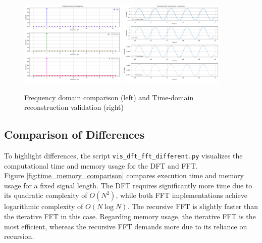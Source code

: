 \documentclass[12pt, a4paper]{report}
\begin{document}
\begin{figure}[h!]
	\centering
	\includegraphics[width=0.45\textwidth]{2023_11_29_Bilder_Dokumentation/Frequency_Domain_Comparison.png}
	\includegraphics[width=0.45\textwidth]{2023_11_29_Bilder_Dokumentation/Time_Domain_Comparison.png}
	\caption{Frequency domain comparison (left) and Time-domain reconstruction validation (right)}
	\label{fig:frequency_domain_comparison}
\end{figure}

\subsection{Comparison of Differences}
To highlight differences, the script \texttt{vis\_dft\_fft\_different.py} visualizes the computational time and memory usage for the \ac{DFT} and \ac{FFT}.\\
Figure \ref{fig:time_memory_comparison} compares execution time and memory usage for a fixed signal length. The \ac{DFT} requires significantly more time due to its quadratic complexity of \(O(N^2)\), while both \ac{FFT} implementations achieve logarithmic complexity of \(O(N \log N)\). The recursive FFT is slightly faster than the iterative FFT in this case. Regarding memory usage, the iterative FFT is the most efficient, whereas the recursive FFT demands more due to its reliance on recursion.
\end{document}
